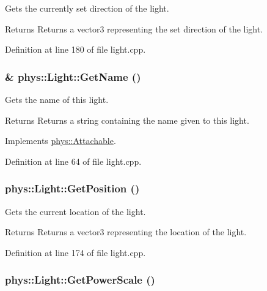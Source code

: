 Gets the currently set direction of the light. 

\begin{DoxyReturn}{Returns}
Returns a vector3 representing the set direction of the light. 
\end{DoxyReturn}


Definition at line 180 of file light.cpp.

\hypertarget{classphys_1_1Light_a70f84fef8451b7d489c21476fa90d9df}{
\subsubsection[{GetName}]{ \& phys::Light::GetName ()}}
\label{dc/df1/classphys_1_1Light_a70f84fef8451b7d489c21476fa90d9df}


Gets the name of this light. 

\begin{DoxyReturn}{Returns}
Returns a string containing the name given to this light. 
\end{DoxyReturn}


Implements \hyperlink{classphys_1_1Attachable_a56d2f5a6f17c14ff0c1d9906d17b0f52}{phys::Attachable}.



Definition at line 64 of file light.cpp.

\hypertarget{classphys_1_1Light_ae2211ed844f8f5e25bcb74c3222a87d1}{
\subsubsection[{GetPosition}]{ phys::Light::GetPosition ()}}
\label{dc/df1/classphys_1_1Light_ae2211ed844f8f5e25bcb74c3222a87d1}


Gets the current location of the light. 

\begin{DoxyReturn}{Returns}
Returns a vector3 representing the location of the light. 
\end{DoxyReturn}


Definition at line 174 of file light.cpp.

\hypertarget{classphys_1_1Light_a686dece4d19fbf37705e47e605f7fabf}{
\subsubsection[{GetPowerScale}]{ phys::Light::GetPowerScale ()}}
\label{dc/df1/classphys_1_1Light_a686dece4d19fbf37705e47e605f7fabf}


